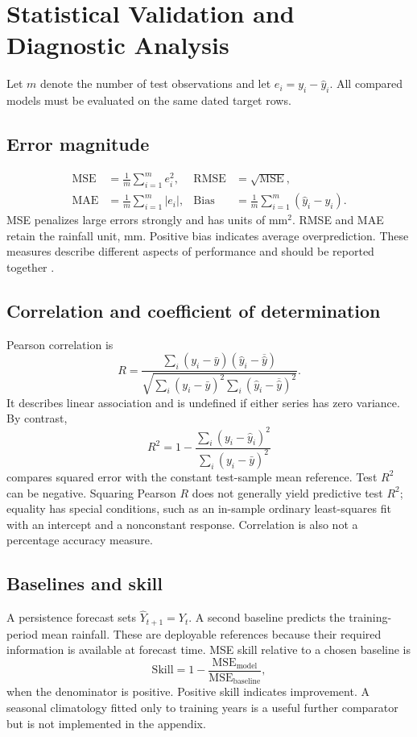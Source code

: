 \documentclass[11pt,a4paper]{article}
\newcommand{\sectionpage}[1]{\clearpage\section{#1}}
\begin{document}
\sectionpage{Statistical Validation and Diagnostic Analysis}
Let $m$ denote the number of test observations and let $e_i=y_i-\widehat y_i$. All compared models must be evaluated on the same dated target rows.

\subsection{Error magnitude}
\begin{align}
\mathrm{MSE}&=\frac{1}{m}\sum_{i=1}^m e_i^2,&
\mathrm{RMSE}&=\sqrt{\mathrm{MSE}},\\
\mathrm{MAE}&=\frac{1}{m}\sum_{i=1}^m|e_i|,&
\mathrm{Bias}&=\frac{1}{m}\sum_{i=1}^m(\widehat y_i-y_i).
\end{align}
MSE penalizes large errors strongly and has units of mm$^2$. RMSE and MAE retain the rainfall unit, mm. Positive bias indicates average overprediction. These measures describe different aspects of performance and should be reported together \cite{metrics}.

\subsection{Correlation and coefficient of determination}
Pearson correlation is
\begin{equation}
R=\frac{\sum_i(y_i-\bar y)(\widehat y_i-\overline{\widehat y})}
{\sqrt{\sum_i(y_i-\bar y)^2\sum_i(\widehat y_i-\overline{\widehat y})^2}}.
\end{equation}
It describes linear association and is undefined if either series has zero variance. By contrast,
\begin{equation}
R^2=1-\frac{\sum_i(y_i-\widehat y_i)^2}{\sum_i(y_i-\bar y)^2}
\end{equation}
compares squared error with the constant test-sample mean reference. Test $R^2$ can be negative. Squaring Pearson $R$ does not generally yield predictive test $R^2$; equality has special conditions, such as an in-sample ordinary least-squares fit with an intercept and a nonconstant response. Correlation is also not a percentage accuracy measure.

\subsection{Baselines and skill}
A persistence forecast sets $\widehat Y_{t+1}=Y_t$. A second baseline predicts the training-period mean rainfall. These are deployable references because their required information is available at forecast time. MSE skill relative to a chosen baseline is
\begin{equation}
\mathrm{Skill}=1-\frac{\mathrm{MSE}_{\mathrm{model}}}{\mathrm{MSE}_{\mathrm{baseline}}},
\end{equation}
when the denominator is positive. Positive skill indicates improvement. A seasonal climatology fitted only to training years is a useful further comparator but is not implemented in the appendix.
\end{document}
